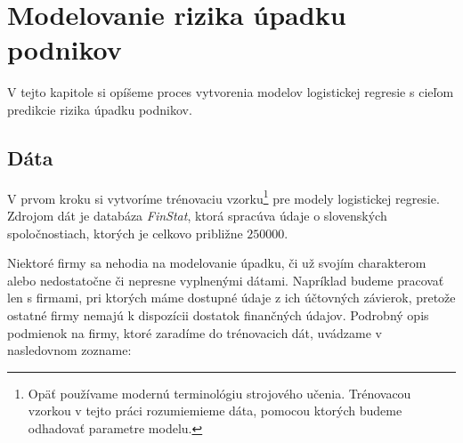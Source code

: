 \section{Modelovanie rizika úpadku podnikov}

V tejto kapitole si opíšeme proces vytvorenia modelov logistickej regresie s cieľom predikcie rizika úpadku podnikov.

\subsection{Dáta}

V prvom kroku si vytvoríme trénovaciu vzorku\footnote{Opäť používame modernú terminológiu strojového učenia. Trénovacou vzorkou v tejto práci rozumiemieme dáta, pomocou ktorých budeme odhadovať parametre modelu.} pre modely logistickej regresie.
Zdrojom dát je databáza \emph{FinStat}, ktorá spracúva údaje o slovenských spoločnostiach, ktorých je celkovo približne \(250000\).

Niektoré firmy sa nehodia na modelovanie úpadku, či už svojím charakterom alebo nedostatočne či nepresne vyplnenými dátami.
Napríklad budeme pracovať len s firmami, pri ktorých máme dostupné údaje z ich účtovných závierok, pretože ostatné firmy nemajú k dispozícii dostatok finančných údajov.
Podrobný opis podmienok na firmy, ktoré zaradíme do trénovacich dát, uvádzame v nasledovnom zozname:

